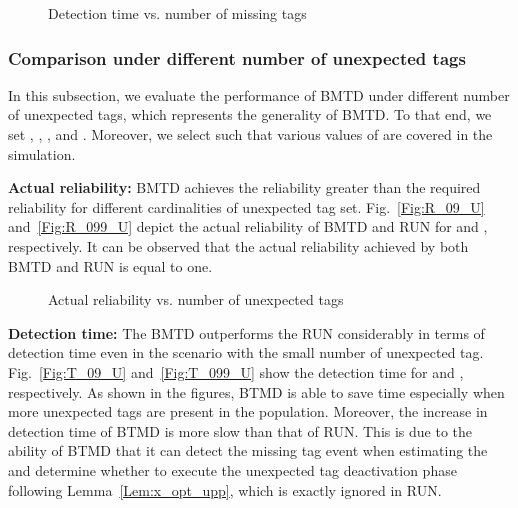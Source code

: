 \documentclass[10pt, twocolumn]{IEEEtran}
\begin{document}
\begin{figure}[htbp]
\centering
{}
\caption{Detection time vs. number of missing tags}
\label{Fig:T_m}
\end{figure}

\subsubsection{Comparison under different number of unexpected tags}
In this subsection, we evaluate the performance of BMTD under different number of unexpected tags, which represents the generality of BMTD. To that end, we set , , ,  and . Moreover, we select such  that various values of  are covered in the simulation.

\textbf{Actual reliability:}
BMTD achieves the reliability greater than the required reliability for different cardinalities of unexpected tag set.
Fig.~\ref{Fig:R_09_U} and~\ref{Fig:R_099_U} depict the actual reliability of BMTD and RUN for  and , respectively. It can be observed that the actual reliability achieved by both BMTD and RUN is equal to one.

\begin{figure}[htbp]
\centering
{}
\caption{Actual reliability vs. number of unexpected tags}
\label{Fig:R_U}
\end{figure}

\textbf{Detection time:}
The BMTD outperforms the RUN considerably in terms of detection time even in the scenario with the small number of unexpected tag.
Fig.~\ref{Fig:T_09_U} and~\ref{Fig:T_099_U} show the detection time for  and , respectively. As shown in the figures, BTMD is able to save time especially when more unexpected tags are present in the population. Moreover, the increase in detection time of BTMD is more slow than that of RUN. This is due to the ability of BTMD that it can detect the missing tag event when estimating the  and determine whether to execute the unexpected tag deactivation phase following Lemma~\ref{Lem:x_opt_upp}, which is exactly ignored in RUN.
\end{document}
